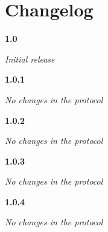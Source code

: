 \chapter{Changelog}

\noindent
\textbf{1.0}
\begin{itemize}
	\renewcommand{\labelitemi}{$\bullet$}
	\textit{Initial release}
\end{itemize}
\newline

\noindent
\textbf{1.0.1}
\begin{itemize}
	\renewcommand{\labelitemi}{$\bullet$}
	\textit{No changes in the protocol}
\end{itemize}
\newline

\noindent
\textbf{1.0.2}
\begin{itemize}
	\renewcommand{\labelitemi}{$\bullet$}
	\textit{No changes in the protocol}
\end{itemize}
\newline

\noindent
\textbf{1.0.3}
\begin{itemize}
	\renewcommand{\labelitemi}{$\bullet$}
	\textit{No changes in the protocol}
\end{itemize}
\newline

\noindent
\textbf{1.0.4}
\begin{itemize}
	\renewcommand{\labelitemi}{$\bullet$}
	\textit{No changes in the protocol}
\end{itemize}
\newline